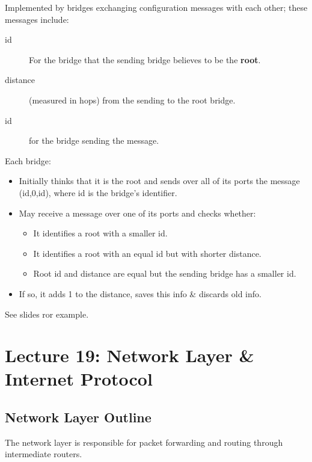 \documentclass{article}%
\begin{document}
Implemented by bridges exchanging configuration messages with each other; these messages include:
\begin{description}
\item[{id}] For the bridge that the sending bridge believes to be the \textbf{root}.
\item[{distance}] (measured in hops) from the sending to the root bridge.
\item[{id}] for the bridge sending the message.
\end{description}
Each bridge:
\begin{itemize}
\item Initially thinks that it is the root and sends over all of its ports the message (id,0,id), where id is the bridge's identifier.
\item May receive a message over one of its ports and checks whether:
\begin{itemize}
\item It identifies a root with a smaller id.
\item It identifies a root with an equal id but with shorter distance.
\item Root id and distance are equal but the sending bridge has a smaller id.
\end{itemize}
\item If so, it adds 1 to the distance, saves this info \& discards old info.
\end{itemize}
See slides ror example.

\maketitle
\section{Lecture 19: Network Layer \& Internet Protocol}


\subsection{Network Layer Outline}
\label{sec:org7bc5dd6}
The network layer is responsible for packet forwarding and routing through intermediate routers.
\end{document}
